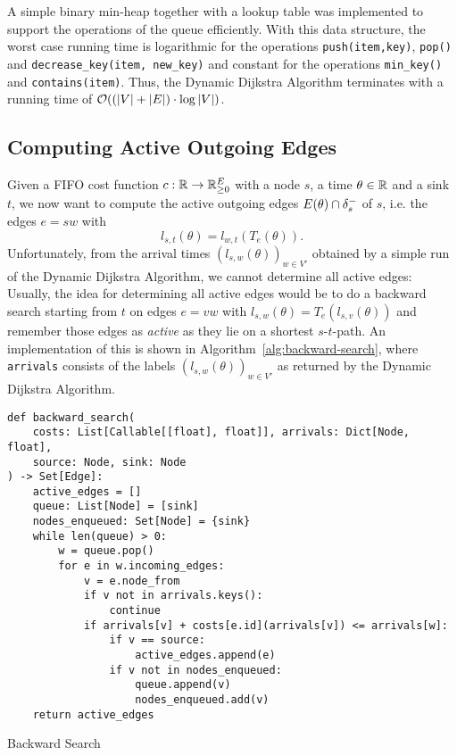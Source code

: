 A simple binary min-heap together with a lookup table was implemented to support the operations of the queue efficiently.
With this data structure, the worst case running time is logarithmic for the operations \texttt{push(item,key)}, \texttt{pop()} and \texttt{decrease\_key(item, new\_key)} and constant for the operations \texttt{min\_key()} and \texttt{contains(item)}.
Thus, the Dynamic Dijkstra Algorithm terminates with a running time of $\mathcal{O}( (\left| V \right| + \left| E \right|) \cdot \log \left| V \right|)$.


\subsection{Computing Active Outgoing Edges}

Given a FIFO cost function $c: \mathbb{R}\rightarrow\mathbb{R}_{\geq0}^E$ with a node $s$, a time $\theta\in\mathbb{R}$ and a sink $t$, we now want to compute the active outgoing edges $E(\theta) \cap \delta^-_{s}$ of $s$, i.e. the edges $e=sw$ with 
\[
    l_{s,t}(\theta) = l_{w,t}(T_e(\theta)).
\]
Unfortunately, from the arrival times $(l_{s,w}(\theta))_{w\in V'}$ obtained by a simple run of the Dynamic Dijkstra Algorithm, we cannot determine all active edges:
Usually, the idea for determining all active edges would be to do a backward search starting from $t$ on edges $e=vw$ with $l_{s,w}(\theta) = T_e(l_{s,v}(\theta))$ and remember those edges as \emph{active} as they lie on a shortest $s$-$t$-path.
An implementation of this is shown in Algorithm~\ref{alg:backward-search}, where \texttt{arrivals} consists of the labels $(l_{s,w}(\theta))_{w\in V'}$ as returned by the Dynamic Dijkstra Algorithm.

\begin{algorithm}[h]
    \begin{verbatim}
def backward_search(
    costs: List[Callable[[float], float]], arrivals: Dict[Node, float],
    source: Node, sink: Node
) -> Set[Edge]:
    active_edges = []
    queue: List[Node] = [sink]
    nodes_enqueued: Set[Node] = {sink}
    while len(queue) > 0:
        w = queue.pop()
        for e in w.incoming_edges:
            v = e.node_from
            if v not in arrivals.keys():
                continue
            if arrivals[v] + costs[e.id](arrivals[v]) <= arrivals[w]:
                if v == source:
                    active_edges.append(e)
                if v not in nodes_enqueued:
                    queue.append(v)
                    nodes_enqueued.add(v)
    return active_edges
    \end{verbatim}
    \caption{Backward Search}
    \label{alg:backward-search}
\end{algorithm}

